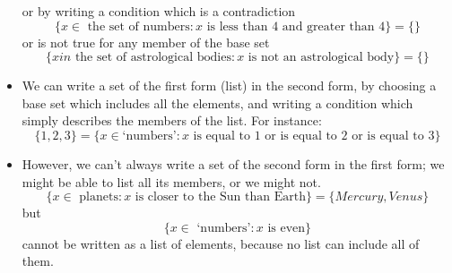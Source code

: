 \begin{itemize}
or by writing a condition which is a contradiction
\[ \{ x \in \text{ the set of numbers} : x \text{ is less than } 4 \text{ and greater than } 4 \} = \{\} \]
or is not true for any member of the base set
\[ \{ x in \text{ the set of astrological bodies} : x \text{ is not an astrological body} \} = \{ \} \]
\item
We can write a set of the first form (list) in the second form, by choosing a base set which includes all the elements, and writing a condition which simply describes the members of the list. For instance:
\[ \{1, 2, 3 \} = \{ x \in \text{`numbers'} : x \text{ is equal to } 1 \text{ or is equal to } 2 \text{ or is equal to } 3 \} \]
\item
However, we can't always write a set of the second form in the first form; we might be able to list all its members, or we might not.
\[ \{ x \in \text{ planets} : x \text{ is closer to the Sun than Earth} \} = \{ Mercury, Venus \} \]
but 
\[ \{ x \in \text{ `numbers'} : x \text{ is even} \} \]
cannot be written as a list of elements, because no list can include all of them.
\end{itemize}
